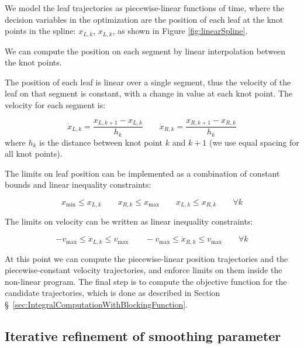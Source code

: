 \documentclass[12pt]{article}
\begin{document}
We model the leaf trajectories as piecewise-linear functions of time,
where the decision variables in the optimization are the position of each leaf
at the knot points in the spline: $x_{L, k}$, $x_{L, k}$, as shown in Figure \ref{fig:linearSpline}.

We can compute the position on each segment by linear interpolation between the knot points.

The position of each leaf is linear over a single segment, thus the velocity of the leaf on that segment is constant,
with a change in value at each knot point.
The velocity for each segment is:

\begin{equation}
  \dot{x}_{L, k} = \frac{x_{L, k+1} - x_{L, k}}{h_k}
  \quad \quad
  \dot{x}_{R, k} = \frac{x_{R, k+1} - x_{R, k}}{h_k}
\end{equation}
\noindent where $h_k$ is the distance between knot point $k$ and $k+1$ (we use equal spacing for all knot points).

The limits on leaf position can be implemented as a combination of
constant bounds and linear inequality constraints:

\begin{equation}
  x_\text{min} \leq x_{L, k}
  \quad \quad
  x_{R, k} \leq x_\text{max}
  \quad \quad
  x_{L, k} \leq x_{R, k}
  \quad \quad
  \forall k
  \label{eqn:PositionLimits}
\end{equation}

The limits on velocity can be written as linear inequality constraints:

\begin{equation}
  -v_\text{max} \leq \dot{x}_{L, k} \leq v_\text{max}
  \quad \quad
  -v_\text{max} \leq \dot{x}_{R, k} \leq v_\text{max}
  \quad \quad \forall k
  \label{eqn:VelocityLimits}
\end{equation}

At this point we can compute the piecewise-linear position trajectories and the
piecewise-constant velocity trajectories, and enforce limits on them inside the non-linear program.
The final step is to compute the objective function for the candidate trajectories,
which is done as described in Section \S~\ref{sec:IntegralComputationWithBlockingFunction}.

\subsection{Iterative refinement of smoothing parameter}
\end{document}
